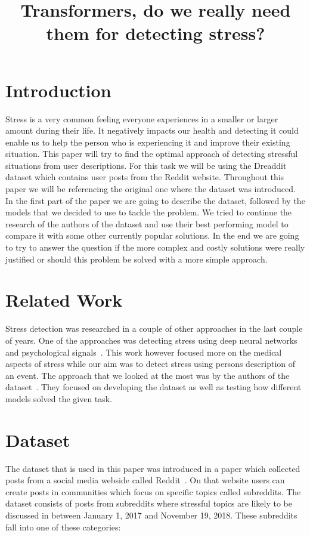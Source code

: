 \documentclass[10pt, a4paper]{article}
\title{Transformers, do we really need them for detecting stress?}
\begin{document}
\maketitleabstract

\section{Introduction}

Stress is a very common feeling everyone experiences in a smaller or larger amount during their life.
It negatively impacts our health and detecting it could enable us to help the person who is experiencing it and improve their existing situation.
This paper will try to find the optimal approach of detecting stressful situations from user descriptions.
For this task we will be using the Dreaddit dataset which contains user posts from the Reddit website.
Throughout this paper we will be referencing the original one where the dataset was introduced.
\hfill \break
\hfill \break
In the first part of the paper we are going to describe the dataset, followed by the models that we decided to use to tackle the problem.
We tried to continue the research of the authors of the dataset and use their best performing model to compare it with some other currently popular solutions.
In the end we are going to try to answer the question if the more complex and costly solutions were really justified or should this problem be solved with a more simple approach.

\section{Related Work}
Stress detection was researched in a couple of other approaches in the last couple of years.
One of the approaches was detecting stress using deep neural networks and psychological signals~\citep{stress-neural}.
This work however focused more on the medical aspects of stress while our aim was to detect stress using persons description of an event.
The approach that we looked at the most was by the authors of the dataset~\citep{turcan-mckeown-2019-dreaddit}.
They focused on developing the dataset as well as testing how different models solved the given task.

\section{Dataset}

The dataset that is used in this paper was introduced in a paper which collected posts from a social media webside called Reddit~\citep{turcan-mckeown-2019-dreaddit}.
On that website users can create posts in communities which focus on specific topics called subreddits.
\hfill \break
\hfill \break
\hfill \break
The dataset consists of posts from subreddits where stressful topics are likely to be discussed in between January 1, 2017 and November 19, 2018.
These subreddits fall into one of these categories:
\end{document}
